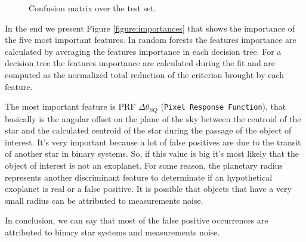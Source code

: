 \documentclass[11pt, a4paper]{article}
\begin{document}
  \begin{figure}
    \centering
    \caption{Confusion matrix over the test set.}
    \label{figure:confusion}
  \end{figure}

  In the end we present Figure \ref{figure:importances} that shows the importance of the five most important features.
  In random forests the features importance are calculated by averaging the features importance in each decision tree.
  For a decision tree the features importance are calculated during the fit and are computed as the normalized total reduction of the criterion brought by each feature. 

  The most important feature is PRF $\Delta\theta_{SQ}$ (\texttt{Pixel Response Function}), that basically is the angular offset on the plane of the sky between the centroid of the star and the calculated centroid of the star during the passage of the object of interest.
  It's very important because a lot of false positives are due to the transit of another star in binary systems.
  So, if this value is big it's most likely that the object of interest is not an exoplanet.
  For some reason, the planetary radius represents another discriminant feature to determinate if an hypothetical exoplanet is real or a false positive.
  It is possible that objects that have a very small radius can be attributed to measurements noise.

  In conclusion, we can say that most of the false positive occurrences are attributed to binary star systems and measurements noise.
\end{document}
